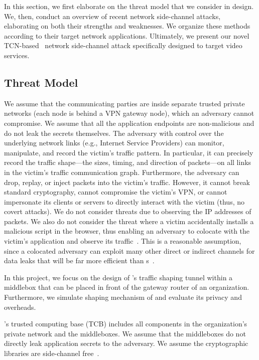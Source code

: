 In this section, we first elaborate on the threat model that we consider in {\sys} design. 
We, then, conduct an overview of recent network side-channel attacks, elaborating on both their strengths and weaknesses.
We organize these methods according to their target network applications.
Ultimately, we present our novel TCN-based~\cite{bai2018empirical} network side-channel attack specifically designed to target video services.

\subsection{{\sys} Threat Model}\label{subsec:threat-model}
We assume that the communicating parties are inside separate trusted private networks (\eg each node is behind a VPN gateway node), which an adversary cannot compromise.
We assume that all the application endpoints are non-malicious and do not leak the secrets themselves.
The adversary with control over the underlying network links (e.g., Internet Service Providers) can monitor, manipulate, and record the victim's traffic pattern.
In particular, it can precisely record the traffic shape---the sizes, timing, and direction of packets---on all links in the victim's traffic communication graph.
Furthermore, the adversary can drop, replay, or inject packets into the victim's traffic.
However, it cannot break standard cryptography, cannot compromise the victim's VPN, or cannot impersonate its clients or servers to directly interact with the victim (thus, no covert attacks).
We do not consider threats due to observing the IP addresses of packets.
We also do not consider the threat where a victim accidentally installs a malicious script in the browser, thus enabling an adversary to colocate with the
victim's application and observe its traffic~\cite{schuster2017beautyburst,mehta2022pacer}.
This is a reasonable assumption, since a colocated adversary can exploit many other direct or indirect channels for data leaks that will be far more efficient than {\nsc}s~\cite{kocher2018spectre, yarom2014flushreload, liu2015llcpractical, irazoqui2015ssa, vila2017loophole}.

In this project, we focus on the design of {\sys}'s traffic shaping tunnel
within a middlebox that can be placed in front of the gateway router of an
organization. 
Furthermore, we simulate shaping mechanism of {\sys} and evaluate its privacy and overheads.

{\sys}'s trusted computing base (TCB) includes all components in the organization's private network and the middleboxes.
We assume that the middleboxes do not directly leak application secrets to the adversary.
We assume the cryptographic libraries are side-channel free~\cite{almeida2016verifying}.

